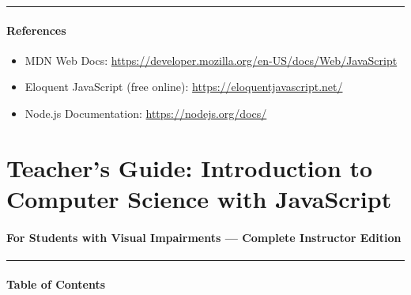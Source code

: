 \documentclass[
  justified,
  openright,
]{tufte-book}
\let\subsection\paragraph
\let\paragraph\paragraph
\let\subsection\paragraph
\let\paragraph\paragraph
\providecommand{\tightlist}{%
  \setlength{\itemsep}{0pt}\setlength{\parskip}{0pt}}
\begin{document}
\begin{center}\rule{0.5\linewidth}{0.5pt}\end{center}

\subsection{References}\label{references}

\begin{itemize}
\tightlist
\item
  MDN Web Docs:
  \url{https://developer.mozilla.org/en-US/docs/Web/JavaScript}
\item
  Eloquent JavaScript (free online):
  \url{https://eloquentjavascript.net/}
\item
  Node.js Documentation: \url{https://nodejs.org/docs/}
\end{itemize}

\newpage

\section{Teacher's Guide: Introduction to Computer Science with
JavaScript}\label{teachers-guide-introduction-to-computer-science-with-javascript}

\subsection{For Students with Visual Impairments --- Complete Instructor
Edition}\label{for-students-with-visual-impairments-complete-instructor-edition-1}

\begin{center}\rule{0.5\linewidth}{0.5pt}\end{center}

\subsection{Table of Contents}\label{table-of-contents-1}
\end{document}
